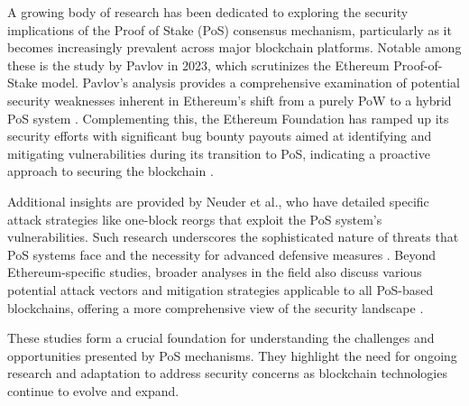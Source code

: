 A growing body of research has been dedicated to exploring the security implications of the Proof of Stake (PoS) consensus mechanism, particularly as it becomes increasingly prevalent across major blockchain platforms. Notable among these is the study by Pavlov in 2023, which scrutinizes the Ethereum Proof-of-Stake model. Pavlov's analysis provides a comprehensive examination of potential security weaknesses inherent in Ethereum's shift from a purely PoW to a hybrid PoS system \cite{pavloff_ethereum_2023}. Complementing this, the Ethereum Foundation has ramped up its security efforts with significant bug bounty payouts aimed at identifying and mitigating vulnerabilities during its transition to PoS, indicating a proactive approach to securing the blockchain \cite{bannister2022ethereum}.

Additional insights are provided by Neuder et al., who have detailed specific attack strategies like one-block reorgs that exploit the PoS system's vulnerabilities. Such research underscores the sophisticated nature of threats that PoS systems face and the necessity for advanced defensive measures \cite{ethereum2023attack}. Beyond Ethereum-specific studies, broader analyses in the field also discuss various potential attack vectors and mitigation strategies applicable to all PoS-based blockchains, offering a more comprehensive view of the security landscape \cite{blockchain_security2023}.

These studies form a crucial foundation for understanding the challenges and opportunities presented by PoS mechanisms. They highlight the need for ongoing research and adaptation to address security concerns as blockchain technologies continue to evolve and expand.